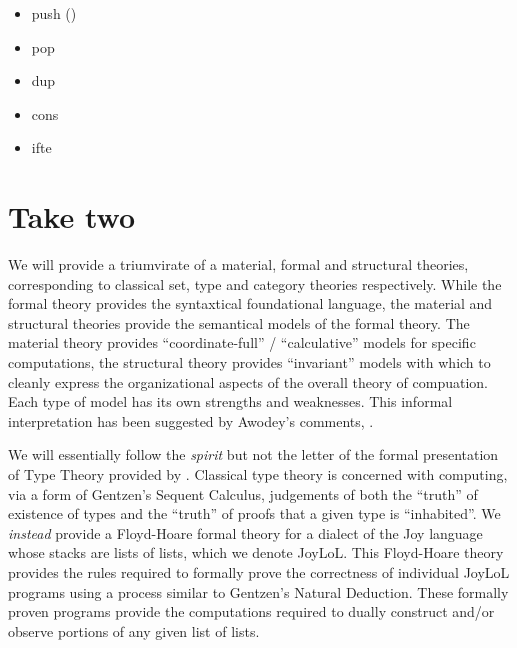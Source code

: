 \documentclass[a4paper,openany]{amsart}
\begin{document}
\begin{itemize}

	\item push () 

	\item pop  

	\item dup  

	\item cons 
	
	\item ifte 

\end{itemize}

\section{Take two}
	
We will provide a triumvirate of a material, formal and structural theories,
corresponding to classical set, type and category theories respectively. While
the formal theory provides the syntaxtical foundational language, the material
and structural theories provide the semantical models of the formal theory. The
material theory provides ``coordinate-full'' / ``calculative'' models for
specific computations, the structural theory provides ``invariant'' models with
which to cleanly express the organizational aspects of the overall theory of
compuation. Each type of model has its own strengths and weaknesses. This
informal interpretation has been suggested by Awodey's comments, \cite[Section 5
``Conclusions'']{awodey2009a}.

We will essentially follow the \emph{spirit} but not the letter of the formal
presentation of Type Theory provided by \cite[Appendix
A.2]{awodeyCoquandVoevodsky2013homotopyTypeTheory}. Classical type theory is
concerned with computing, via a form of Gentzen's Sequent Calculus, judgements
of both the ``truth'' of existence of types and the ``truth'' of proofs that a
given type is ``inhabited''. We \emph{instead} provide a Floyd-Hoare formal
theory for a dialect of the Joy language whose stacks are lists of lists, which
we denote JoyLoL. This Floyd-Hoare theory provides the rules required to
formally prove the correctness of individual JoyLoL programs using a process
similar to Gentzen's Natural Deduction. These formally proven programs provide
the computations required to dually construct and/or observe portions of any
given list of lists.
\end{document}
